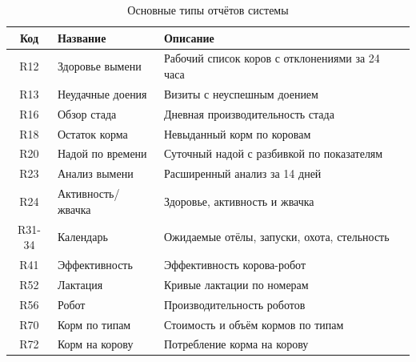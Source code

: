 \begin{table}
  \caption{Основные типы отчётов системы}
  \begin{tabular}{|c|l|p{6cm}|}
    \hline
    \textbf{Код} & \textbf{Название} & \textbf{Описание} \\
    \hline
    R12 & Здоровье вымени & Рабочий список коров с отклонениями за 24 часа \\
    \hline
    R13 & Неудачные доения & Визиты с неуспешным доением \\
    \hline
    R16 & Обзор стада & Дневная производительность стада \\
    \hline
    R18 & Остаток корма & Невыданный корм по коровам \\
    \hline
    R20 & Надой по времени & Суточный надой с разбивкой по показателям \\
    \hline
    R23 & Анализ вымени & Расширенный анализ за 14 дней \\
    \hline
    R24 & Активность/жвачка & Здоровье, активность и жвачка \\
    \hline
    R31-34 & Календарь & Ожидаемые отёлы, запуски, охота, стельность \\
    \hline
    R41 & Эффективность & Эффективность корова-робот \\
    \hline
    R52 & Лактация & Кривые лактации по номерам \\
    \hline
    R56 & Робот & Производительность роботов \\
    \hline
    R70 & Корм по типам & Стоимость и объём кормов по типам \\
    \hline
    R72 & Корм на корову & Потребление корма на корову \\
    \hline
  \end{tabular}
  \label{reports}
\end{table}
